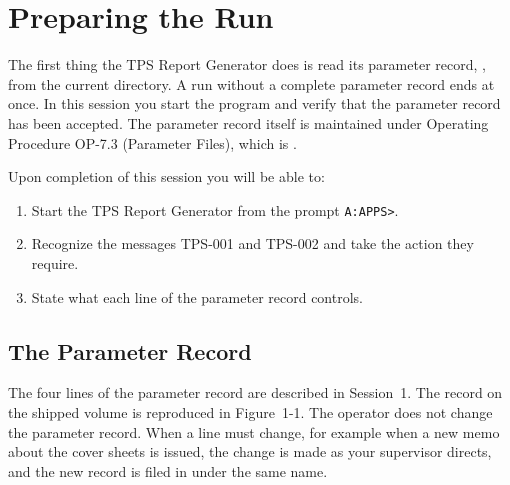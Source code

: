 \chapter{Preparing the Run}

The first thing the TPS Report Generator does is
read its parameter record, , from the current directory.
A run without a complete parameter record ends at once.  In this session you
start the program and verify that the parameter record has been accepted.
The parameter record itself is maintained under Operating Procedure OP-7.3
(Parameter Files), which is .

Upon completion of this session you will be able to:
\begin{enumerate}
\item Start the TPS Report Generator from the prompt \texttt{A:\bs APPS>}.
\item Recognize the messages TPS-001 and TPS-002 and take the action they
  require.
\item State what each line of the parameter record controls.
\end{enumerate}

\section{The Parameter Record}
The four lines of the parameter record are described in Session~1.  The
record on the shipped volume is reproduced in Figure~1-1.  The operator does
not change the parameter record.  When a line must change, for example when
a new memo about the cover sheets is issued, the change is made as your
supervisor directs, and the new record is filed in  under
the same name.

